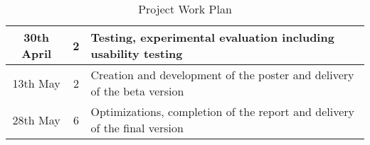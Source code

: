 \begin{table}[h]
\begin{tabular}{|c|c|p{8cm}|}
        \hline
        30th April            & 2                         & Testing, experimental evaluation \newline including usability testing              \\
        \hline
        13th May              & 2                         & Creation and development of the poster \newline and delivery of the beta version   \\
        \hline
        28th May              & 6                         & Optimizations, completion of the report \newline and delivery of the final version \\
        \hline
    \end{tabular}
    \caption{Project Work Plan}
\end{table}




